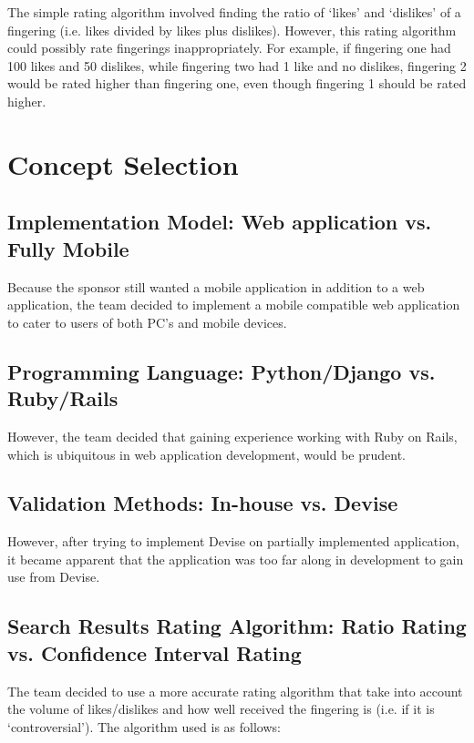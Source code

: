 \documentclass[12pt,english]{article}
\begin{document}
The simple rating algorithm involved finding the ratio of `likes'
and `dislikes' of a fingering (i.e. likes divided by likes plus dislikes).
However, this rating algorithm could possibly rate fingerings inappropriately.
For example, if fingering one had 100 likes and 50 dislikes, while
fingering two had 1 like and no dislikes, fingering 2 would be rated
higher than fingering one, even though fingering 1 should be rated
higher.


\section{Concept Selection}


\subsection{Implementation Model: Web application vs. Fully Mobile}

Because the sponsor still wanted a mobile application in addition
to a web application, the team decided to implement a mobile compatible
web application to cater to users of both PC's and mobile devices.


\subsection{Programming Language: Python/Django vs. Ruby/Rails}

However, the team decided that gaining experience working with Ruby
on Rails, which is ubiquitous in web application development, would
be prudent.


\subsection{Validation Methods: In-house vs. Devise}

However, after trying to implement Devise on partially implemented
application, it became apparent that the application was too far along
in development to gain use from Devise.


\subsection{Search Results Rating Algorithm: Ratio Rating vs. Confidence Interval
Rating}

The team decided to use a more accurate rating algorithm that take
into account the volume of likes/dislikes and how well received the
fingering is (i.e. if it is `controversial'). The algorithm used is
as follows:
\end{document}
